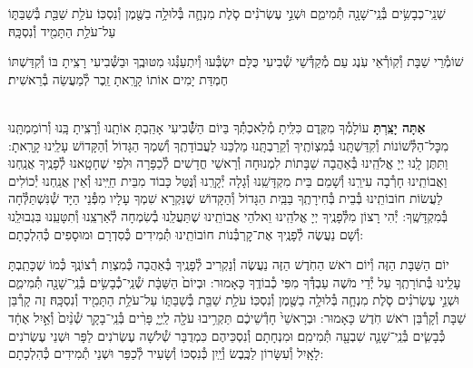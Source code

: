 \documentclass[twoside, openany, parskip=half, 11pt]{book}
\begin{document}
שְׁנֵֽי־כְבָשִׂ֥ים בְּ֯נֵֽי־שָׁנָ֖ה תְּ֯מִימִ֑ם וּשְׁנֵ֣י עֶשְׂרֹנִ֗ים סֹ֧לֶת מִנְחָ֛ה בְּ֯לוּלָ֥ה בַשֶּׁ֖מֶן וְ֯נִסְכּֽוֹ׃ עֹלַ֥ת שַׁבַּ֖ת בְּ֯שַׁבַּתּ֑וֹ עַל־עֹלַ֥ת הַתָּמִ֖יד וְ֯נִסְכָּֽהּ׃

שׁוֹמְ֯רֵי שַׁבָּת וְ֯קֽוֹרְ֯אֵי עֹֽנֶג עַם מְ֯קַדְּ֯שֵׁי שְׁ֯בִיעִי כֻּלָּם יִשְׂבְּ֯עוּ וְ֯יִתְעַנְּ֯גוּ מִטּוּבֶֽךָ וּבַשְּׁ֯בִיעִי רָצִֽיתָ בּוֹ וְ֯קִדַּשְׁתּוֹ חֶמְדַּת יָמִים אוֹתוֹ קָרָֽאתָ זֵֽכֶר לְ֯מַעֲשֵׂה בְ֯רֵאשִׁית׃

\shabboskiddushhayom {}

\begin{sometimes}

\label{shabbosroshchodesh}
\\
\textbf{אַתָּה יָצַֽרְתָּ}
עוֹלָמְ֯ךָ מִקֶּֽדֶם כִּלִּֽיתָ מְ֯לַאכְתְּ֯ךָ בַּיוֹם הַשְּׁ֯֯בִיעִי אָהַֽבְתָּ אוֹתָֽנוּ וְ֯רָצִֽיתָ בָּֽנוּ וְ֯רוֹמַמְתָּֽנוּ מִכׇּל־הַלְּ֯שׁוֹנוֹת וְ֯קִדַּשְׁתָּֽנוּ בְּ֯מִצְוֹתֶֽיךָ וְ֯קֵרַבְתָּֽנוּ מַלְכֵּנוּ לַעֲבוֹדָתֶֽךָ וְ֯שִׁמְךָ הַגָּדוֹל וְ֯הַקָּדוֹשׁ עָלֵֽינוּ קָרָֽאתָ: וַתִּתֶּן לָֽנוּ יְיָ אֱלֹהֵֽינוּ בְּ֯אַהֲבָה שַׁבָּתוֹת לִמְנוּחָה וְ֯רָאשֵׁי חֳדָשִׁים לְ֯כַפָּרָה וּלְפִי שֶׁחָטָֽאנוּ לְ֯פָנֶֽיךָ אֲנַֽחְנוּ וַאֲבוֹתֵֽינוּ חָרְ֯בָה עִירֵֽנוּ וְ֯שָׁמֵם בֵּית מִקְדָּשֵֽׁנוּ וְ֯גָלָה יְ֯קָרֵֽנוּ וְ֯נֻּטַּל כָּבוֹד מִבֵּית חַיֵּֽינוּ וְ֯אֵין אֲנַֽחְנוּ יְ֯כוֹלִים לַעֲשׂוֹת חוֹבוֹתֵֽינוּ בְּ֯בֵית בְּ֯חִירָתֶֽךָ בַּבַּֽיִת הַגָּדוֹל וְ֯הַקָּדוֹשׁ שֶׁנִּקְרָא שִׁמְךָ עָלָיו מִפְּ֯נֵי הַיָּד שְׁ֯נִּשְׁתַּלְּ֯חָה בְּ֯מִקְדָּשֶֽׁךָ: יְ֯הִי רָצוֹן מִלְּ֯פָנֶֽיךָ יְיָ אֱלֹהֵֽינוּ וֵאלֹהֵי אֲבוֹתֵֽינוּ שֶׁתַּעֲלֵֽנוּ בְ֯שִׂמְחָה לְ֯אַרְצֵֽנוּ וְ֯תִטָּעֵֽנוּ בִּגְבוּלֵֽנוּ וְ֯שָׁם נַעֲשֶׂה לְ֯פָנֶֽיךָ אֶת־קׇרְבְּ֯נוֹת חוֹבוֹתֵֽינוּ תְּ֯מִידִים כְּ֯סִדְרָם וּמוּסָפִים כְּ֯הִלְכָתָם:

יוֹם הַשַּׁבָּת הַזֶּה וְ֯יוֹם רֹאשׁ הַחֹֽדֶשׁ הַזֶּה נַעֲשֶׂה וְ֯נַקְרִיב לְ֯פָנֶֽיךָ בְּ֯אַהֲבָה כְּ֯מִצְוַת רְ֯צוֹנֶֽךָ כְּ֯מוֹ שֶׁכָּתַֽבְתָּ עָלֵֽינוּ בְּ֯תוֹרָתֶֽךָ עַל יְ֯דֵי מֹשֶׁה עַבְדְּ֯ךָ מִפִּי כְ֯בוֹדֶֽךָ כָּאָמוּר: וּבְיוֹם֙ הַשַּׁבָּ֔ת שְׁ֯נֵֽי־כְ֯בָשִׂ֥ים בְּ֯נֵֽי־שָׁנָ֖ה תְּ֯מִימִ֑ם וּשְׁנֵ֣י עֶשְׂרֹנִ֗ים סֹ֧לֶת מִנְחָ֛ה בְּ֯לוּלָ֥ה בַשֶּׁ֖מֶן וְ֯נִסְכּֽוֹ׃ עֹלַ֥ת שַׁבַּ֖ת בְּ֯שַׁבַּתּ֑וֹ עַל־עֹלַ֥ת הַתָּמִ֖יד וְ֯נִסְכָּֽהּ׃ זֶה קָרְ֯בַּן שַׁבָּת וְ֯קָרְ֯בַּן רֹאשׁ חֹֽדֶשׁ כָּאָמוּר: וּבְרָאשֵׁי֙ חָדְ֯שֵׁיכֶ֔ם תַּקְרִ֥יבוּ עֹלָ֖ה לַֽיְיָ֑ פָּרִ֨ים בְּ֯נֵֽי־בָקָ֤ר שְׁ֯נַ֨יִם֙ וְ֯אַ֣יִל אֶחָ֔ד כְּ֯בָשִׂ֧ים בְּ֯נֵֽי־שָׁנָ֛ה שִׁבְעָ֖ה תְּ֯מִימִֽם׃ וּמִנְחָתָם וְ֯נִסְכֵּיהֶם כִּמְדֻבָּר שְׁ֯לֹשָׁה עֶשְׂרֹנִים לַפָּר וּשְׁנֵי עֶשְׂרֹנִים לָאָֽיִל וְ֯עִשָּׂרוֹן לַכֶּֽבֶשׂ וְ֯יַֽיִן כְּ֯נִסְכּוֹ וְ֯שָׂעִיר לְ֯כַפֵּר וּשְׁנֵי תְ֯מִידִים כְּ֯הִלְכָתָם:


\end{sometimes}
\end{document}
